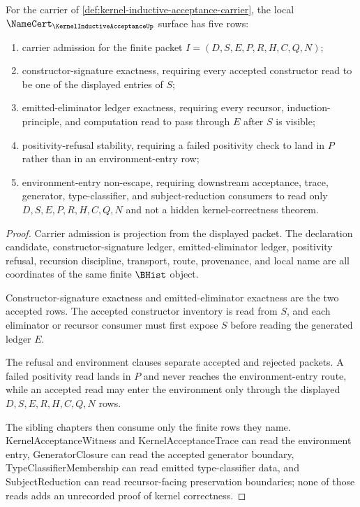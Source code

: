 \begin{theorem}
\label{thm:kernel-inductive-acceptance-namecert-obligations}
For the carrier of \autoref{def:kernel-inductive-acceptance-carrier}, the local $\NameCert_{\KernelInductiveAcceptanceUp}$ surface has five rows:
\begin{enumerate}
\item carrier admission for the finite packet $I=(D,S,E,P,R,H,C,Q,N)$;
\item constructor-signature exactness, requiring every accepted constructor read to be one of the displayed entries of $S$;
\item emitted-eliminator ledger exactness, requiring every recursor, induction-principle, and computation read to pass through $E$ after $S$ is visible;
\item positivity-refusal stability, requiring a failed positivity check to land in $P$ rather than in an environment-entry row;
\item environment-entry non-escape, requiring downstream acceptance, trace, generator, type-classifier, and subject-reduction consumers to read only $D,S,E,P,R,H,C,Q,N$ and not a hidden kernel-correctness theorem.
\end{enumerate}
\end{theorem}
\begin{proof}
Carrier admission is projection from the displayed packet. The declaration candidate, constructor-signature ledger, emitted-eliminator ledger, positivity refusal, recursion discipline, transport, route, provenance, and local name are all coordinates of the same finite $\BHist$ object.

Constructor-signature exactness and emitted-eliminator exactness are the two accepted rows. The accepted constructor inventory is read from $S$, and each eliminator or recursor consumer must first expose $S$ before reading the generated ledger $E$.

The refusal and environment clauses separate accepted and rejected packets. A failed positivity read lands in $P$ and never reaches the environment-entry route, while an accepted read may enter the environment only through the displayed $D,S,E,R,H,C,Q,N$ rows.

The sibling chapters then consume only the finite rows they name. KernelAcceptanceWitness and KernelAcceptanceTrace can read the environment entry, GeneratorClosure can read the accepted generator boundary, TypeClassifierMembership can read emitted type-classifier data, and SubjectReduction can read recursor-facing preservation boundaries; none of those reads adds an unrecorded proof of kernel correctness.
\end{proof}

